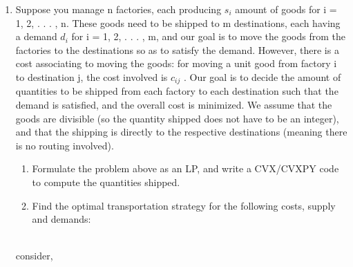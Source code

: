 \documentclass[journal,12pt,twocolumn]{IEEEtran}
\begin{document}
\begin{enumerate}
\item Suppose you manage n factories, each producing $s_i$ amount of goods for i = 1, 2, . . . , n. These goods
need to be shipped to m destinations, each having a demand $d_i$ for i = 1, 2, . . . , m, and our goal is to
move the goods from the factories to the destinations so as to satisfy the demand. However, there is a
cost associating to moving the goods: for moving a unit good from factory i to destination j, the cost
involved is $c_{ij}$ . Our goal is to decide the amount of quantities to be shipped from each factory to each
destination such that the demand is satisfied, and the overall cost is minimized. We assume that the
goods are divisible (so the quantity shipped does not have to be an integer), and that the shipping is
directly to the respective destinations (meaning there is no routing involved).
\begin{enumerate}
\item Formulate the problem above as an LP, and write a CVX/CVXPY code to compute the quantities
shipped.
\item Find the optimal transportation strategy for the following costs, supply and demands:
\end{enumerate}
\begin{table}[H]
 \centering
 \caption{}
 \end{table}
\solution\\
consider,
 \begin{table}[H]
 \centering
\end{table}
\end{enumerate}
\end{document}

